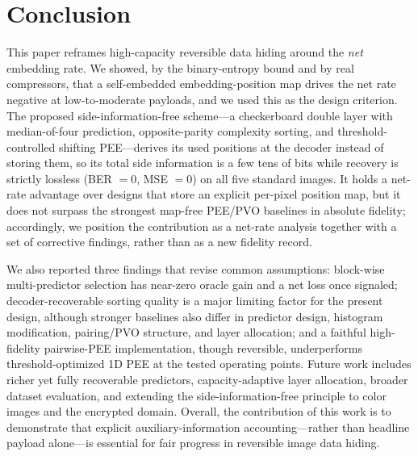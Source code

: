 \documentclass[journal,article,submit,pdftex,moreauthors]{Definitions/mdpi}
\begin{document}
\section{Conclusion}\label{sec:conclusion}
This paper reframes high-capacity reversible data hiding around the \emph{net} embedding rate. We showed, by the binary-entropy bound and by real compressors, that a self-embedded embedding-position map drives the net rate negative at low-to-moderate payloads, and we used this as the design criterion. The proposed side-information-free scheme---a checkerboard double layer with median-of-four prediction, opposite-parity complexity sorting, and threshold-controlled shifting PEE---derives its used positions at the decoder instead of storing them, so its total side information is a few tens of bits while recovery is strictly lossless (BER $=0$, MSE $=0$) on all five standard images. It holds a net-rate advantage over designs that store an explicit per-pixel position map, but it does not surpass the strongest map-free PEE/PVO baselines in absolute fidelity; accordingly, we position the contribution as a net-rate analysis together with a set of corrective findings, rather than as a new fidelity record.

We also reported three findings that revise common assumptions: block-wise multi-predictor selection has near-zero oracle gain and a net loss once signaled; decoder-recoverable sorting quality is a major limiting factor for the present design, although stronger baselines also differ in predictor design, histogram modification, pairing/PVO structure, and layer allocation; and a faithful high-fidelity pairwise-PEE implementation, though reversible, underperforms threshold-optimized 1D PEE at the tested operating points. Future work includes richer yet fully recoverable predictors, capacity-adaptive layer allocation, broader dataset evaluation, and extending the side-information-free principle to color images and the encrypted domain. Overall, the contribution of this work is to demonstrate that explicit auxiliary-information accounting---rather than headline payload alone---is essential for fair progress in reversible image data hiding.



%
\end{document}

